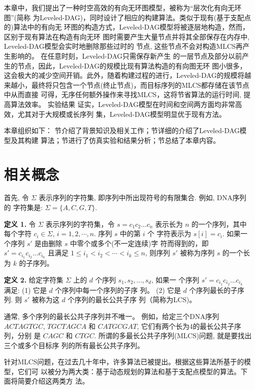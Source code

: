 \documentclass[utf8]{frontiersSCNS} %
\begin{document}
本章中，我们提出了一种时空高效的有向无环图模型，被称为“层次化有向无环图”(简称
为Leveled-DAG)，同时设计了相应的构建算法。类似于现有(基于支配点的)算法中的有向无
环图的构造方式，Leveled-DAG模型将被逐层地构造，然而，区别于现有算法在构造有向无环
图时需要产生大量节点并将其全部保存在内存中, Leveled-DAG模型会实时地删除那些过时的
节点, 这些节点不会对构造MLCS再产生影响的。 在任意时刻，Leveled-DAG只需保存新产生
的一层节点及部分以前产生的节点，因此，Leveled-DAG的规模比现有算法构造的有向图无环
图小很多，这会极大的减少空间开销。此外，随着构建过程的进行，Leveled-DAG的规模将越
来越小，最终将只包含一个节点(终止节点)，而目标序列的MLCS都存储在该节点中从而直接
可得，无序任何额外操作来寻找MLCS，这将节省算法的运行时间, 提高算法效率。 实验结果
证实，Leveled-DAG模型在时间和空间两方面均非常高效，尤其对于大规模或长序列
集，Leveled-DAG模型明显优于现有方法。

本章组织如下： 节介绍了背景知识及相关工作；节详细的介绍了Leveled-DAG模型及其构建
算法；节进行了仿真实验和结果分析；节总结了本章内容。



\section{相关概念}
\label{sec:MM}

首先, 令 $\Sigma$ 表示序列的字符集, 即序列中所出现符号的有限集合. 例如, DNA序列的
字符集是: $\Sigma=\{A, C, G, T\}$.

\textbf{定义 1.} 令 $\Sigma$ 表示序列的字符集，令 $s=c_1c_2...c_n$ 表示长为 $n$
的一个序列，其中每个字符 $c_i\in\Sigma$, $i=1,2,\cdots,n$. 序列 $s$ 中的第 $i$ 个
字符表示为 $s[i]=c_i$. 如果一个序列 $s'$ 是由删除 $s$ 中零个或多个(不一定连续)字
符而得到的，即 $s'=c_{i_1}c_{i_2}...c_{i_k}$ 且满足 $1 \leq i_1<i_2<\cdots<i_k
\leq n$, 则序列 $s'$ 被称为序列 $s$ 的一个长为 $k$ 的子序列。

\textbf{定义 2.} 给定字符集 $\Sigma$ 上的 $d$ 个序列 $s_1, s_2, ..., s_d$, 如果一
个序列 $s'=c_{i_1}c_{i_2}...c_{i_k}$ 满足: (1) 它是 $d$ 个序列中每一个序列的子序
列。 (2) 它是 $d$ 个序列最长的子序列. 则 $s'$ 被称为这 $d$ 个序列的最长公共子序
列（简称为LCS)。

通常, 多个序列的最长公共子序列并不唯一。 例如，给定三个DNA序列 $ACTAGTGC$,
$TGCTAGCA$ 和 $CATGCGAT$, 它们有两个长为4的最长公共子序列，分别
是 $CAGC$ 和 $CTGC$. 所谓的多最长公共子序列(MLCS)问题, 就是要找出三个或多个目标序
列的所有最长公共子序列。

针对MLCS问题，在过去几十年中，许多算法已被提出。根据这些算法所基于的模型，它们可
以被分为两大类：基于动态规划的算法和基于支配点模型的算法。下面将简要介绍这两类方
法。
\end{document}
